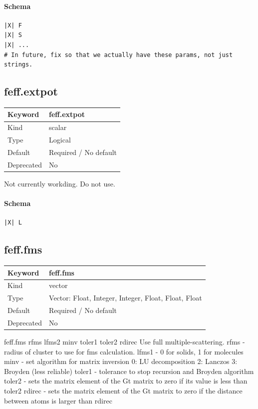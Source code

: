 \documentclass[11pt]{article}
\begin{document}
{{{\paragraph{Schema}
\begin{Verbatim}
|X| F
|X| S
|X| ...
# In future, fix so that we actually have these params, not just strings.
\end{Verbatim}

\subsection{feff.extpot}
\label{kw:feff-extpot}
\begin{longtable}{|p{1.5in}|p{4.5in}|}
\hline
Keyword & feff.extpot \\
\hline
Kind & scalar \\
\hline
Type & Logical \\
\hline
Default & Required / No default \\
\hline
Deprecated & No \\
\hline
\end{longtable}
 Not currently workding. Do not use.

\paragraph{Schema}
\begin{Verbatim}
|X| L
\end{Verbatim}

\subsection{feff.fms}
\label{kw:feff-fms}
\begin{longtable}{|p{1.5in}|p{4.5in}|}
\hline
Keyword & feff.fms \\
\hline
Kind & vector \\
\hline
Type & Vector: Float, Integer, Integer, Float, Float, Float \\
\hline
Default & Required / No default \\
\hline
Deprecated & No \\
\hline
\end{longtable}
 feff.fms{ rfms lfms2 minv toler1 toler2 rdirec }
 Use full multiple-scattering.
 rfms   - radius of cluster to use for fms calculation.
 lfms1  - 0 for solids, 1 for molecules
 minv   - set algorithm for matrix inversion
          0: LU decomposition
          2: Lanczos
          3: Broyden (less reliable)
 toler1 - tolerance to stop recursion and Broyden algorithm
 toler2 - sets the matrix element of the Gt matrix to zero if its value is
          less than toler2
 rdirec - sets the matrix element of the Gt matrix to zero if the distance
          between atoms is larger than rdirec

}}}
\end{document}
